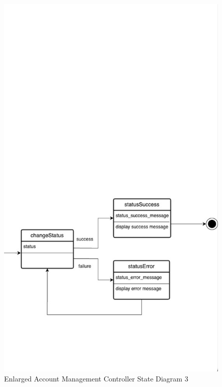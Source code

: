 \documentclass[]{article}
\begin{document}
\begin{figure}[H]
	\centering
	\includegraphics[scale=0.75]{account-3.png}
	\caption{Enlarged Account Management Controller State Diagram 3}
	\label{fig:authentication-controller}
\end{figure}
\end{document}

